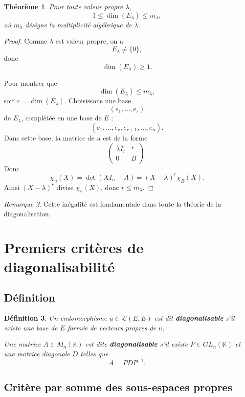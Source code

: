 \documentclass[11pt,a4paper]{article}
\newtheorem{definition}{Définition}[section]
\newtheorem{theoreme}[definition]{Théorème}
\theoremstyle{remark}
\newtheorem{remarque}[definition]{Remarque}
\newcommand{\K}{\mathbb{K}}
\begin{document}
\begin{theoreme}
Pour toute valeur propre \(\lambda\),
\[
1\le \dim(E_\lambda)\le m_\lambda,
\]
où \(m_\lambda\) désigne la multiplicité algébrique de \(\lambda\).
\end{theoreme}

\begin{proof}
Comme \(\lambda\) est valeur propre, on a
\[
E_\lambda\neq \{0\},
\]
donc
\[
\dim(E_\lambda)\ge 1.
\]

Pour montrer que
\[
\dim(E_\lambda)\le m_\lambda,
\]
soit \(r=\dim(E_\lambda)\). Choisissons une base
\[
(e_1,\dots,e_r)
\]
de \(E_\lambda\), complétée en une base de \(E\) :
\[
(e_1,\dots,e_r,e_{r+1},\dots,e_n).
\]
Dans cette base, la matrice de \(u\) est de la forme
\[
\begin{pmatrix}
\lambda I_r & *\\
0 & B
\end{pmatrix}.
\]
Donc
\[
\chi_u(X)=\det(XI_n-A)=(X-\lambda)^r\chi_B(X).
\]
Ainsi \((X-\lambda)^r\) divise \(\chi_u(X)\), donc \(r\le m_\lambda\).
\end{proof}

\begin{remarque}
Cette inégalité est fondamentale dans toute la théorie de la diagonalisation.
\end{remarque}

\section{Premiers critères de diagonalisabilité}

\subsection{Définition}

\begin{definition}
Un endomorphisme \(u\in\mathcal L(E,E)\) est dit \textbf{diagonalisable} s’il existe une base de \(E\) formée de vecteurs propres de \(u\).

Une matrice \(A\in M_n(\K)\) est dite \textbf{diagonalisable} s’il existe \(P\in GL_n(\K)\) et une matrice diagonale \(D\) telles que
\[
A=PDP^{-1}.
\]
\end{definition}

\subsection{Critère par somme des sous-espaces propres}
\end{document}
